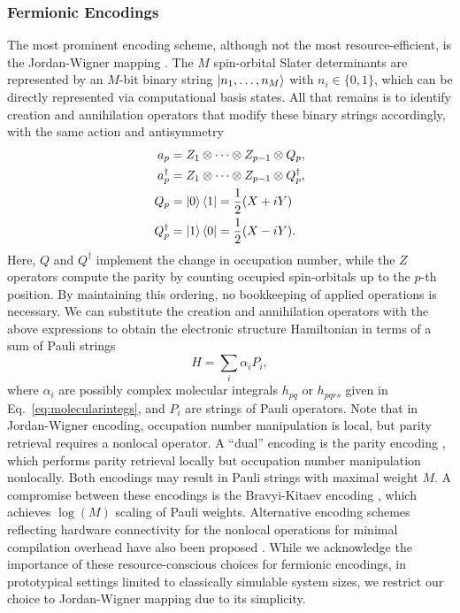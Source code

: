 \documentclass[../main.tex]{subfiles}
\begin{document}
\subsubsection{Fermionic Encodings}
The most prominent encoding scheme, although not the most resource-efficient, is the Jordan-Wigner mapping \cite{jordan1928uber, mcardle2020quantum}. The $M$ spin-orbital Slater determinants are represented by an $M$-bit binary string  $\ket{n_1,\dots,n_M}$ with $n_i \in \{0,1\}$, which can be directly represented via computational basis states. All that remains is to identify creation and annihilation operators that modify these binary strings accordingly, with the same action and antisymmetry
\begin{align}
    a_p &= Z_1 \otimes \cdots \otimes Z_{p-1} \otimes Q_p, \\
    a_p^\dagger &= Z_1 \otimes \cdots \otimes Z_{p-1} \otimes Q_p^\dagger, \\
    Q_p &= \ket{0} \bra{1} = \frac{1}{2}(X + i Y) \\
    Q_p^\dagger &= \ket{1} \bra{0} = \frac{1}{2}(X - i Y).
\end{align}
Here, $Q$ and $Q^\dagger$ implement the change in occupation number, while the $Z$ operators compute the parity by counting occupied spin-orbitals up to the $p$-th position. By maintaining this ordering, no bookkeeping of applied operations is necessary.
We can substitute the creation and annihilation operators with the above expressions to obtain the electronic structure Hamiltonian in terms of a sum of Pauli strings
\begin{equation}
    H = \sum_i \alpha_i P_i,
\end{equation} where $\alpha_i$ are possibly complex molecular integrals $h_{pq}$ or $h_{pqrs}$ given in Eq.~\ref{eq:molecularintegs}, and $P_i$ are strings of Pauli operators. Note that in Jordan-Wigner encoding, occupation number manipulation is local, but parity retrieval requires a nonlocal operator. A ``dual'' encoding is the parity encoding \cite{seeley2012the}, which performs parity retrieval locally but occupation number manipulation nonlocally. Both encodings may result in Pauli strings with maximal weight $M$. A compromise between these encodings is the Bravyi-Kitaev encoding \cite{bravyi2002fermionic}, which achieves $\log(M)$ scaling of Pauli weights. Alternative encoding schemes reflecting hardware connectivity for the nonlocal operations for minimal compilation overhead have also been proposed \cite{miller2022the, chiew2023discovering}. While we acknowledge the importance of these resource-conscious choices for fermionic encodings, in prototypical settings limited to classically simulable system sizes, we restrict our choice to Jordan-Wigner mapping due to its simplicity.
\end{document}
